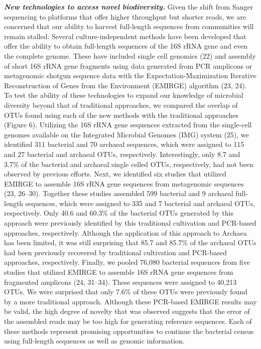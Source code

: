 \documentclass[11pt,]{article}
\begin{document}
\textbf{\emph{New technologies to access novel biodiversity.}} Given the
shift from Sanger sequencing to platforms that offer higher throughput
but shorter reads, we are concerned that our ability to harvest
full-length sequences from communities will remain stalled. Several
culture-independent methods have been developed that offer the ability
to obtain full-length sequences of the 16S rRNA gene and even the
complete genome. These have included single cell genomics (22) and
assembly of short 16S rRNA gene fragments using data generated from PCR
amplicons or metagenomic shotgun sequence data with the
Expectation-Maximization Iterative Reconstruction of Genes from the
Environment (EMIRGE) algorithm (23, 24). To test the ability of these
technologies to expand our knowledge of microbial diversity beyond that
of traditional approaches, we compared the overlap of OTUs found using
each of the new methods with the traditional approaches (Figure 6).
Utilizing the 16S rRNA gene sequences extracted from the single-cell
genomes available on the Integrated Microbial Genomes (IMG) system (25),
we identified 311 bacterial and 70 archaeal sequences, which were
assigned to 115 and 27 bacterial and archaeal OTUs, respectively.
Interestingly, only 8.7 and 3.7\% of the bacterial and archaeal single
celled OTUs, respectively, had not been observed by previous efforts.
Next, we identified six studies that utilized EMIRGE to assemble 16S
rRNA gene sequences from metagenomic sequences (23, 26--30). Together
these studies assembled 599 bacterial and 9 archaeal full-length
sequences, which were assigned to 335 and 7 bacterial and archaeal OTUs,
respectively. Only 40.6 and 60.3\% of the bacterial OTUs generated by
this approach were previously identified by this traditional cultivation
and PCR-based approaches, respectively. Although the application of this
approach to Archaea has been limited, it was still surprising that 85.7
and 85.7\% of the archaeal OTUs had been previously recovered by
traditional cultivation and PCR-based approaches, respectively. Finally,
we pooled 76,080 bacterial sequences from five studies that utilized
EMIRGE to assemble 16S rRNA gene sequences from fragmented amplicons
(24, 31--34). These sequences were assigned to 40,213 OTUs. We were
surprised that only 7.6\% of these OTUs were previously found by a more
traditional approach. Although these PCR-based EMIRGE results may be
valid, the high degree of novelty that was observed suggests that the
error of the assembled reads may be too high for generating reference
sequences. Each of these methods represent promising opportunities to
continue the bacterial census using full-length sequences as well as
genomic information.
\end{document}
